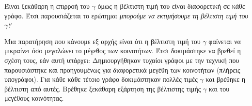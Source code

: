 \documentclass[12pt, letterpaper]{article}
\begin{document}
Έιναι ξεκάθαρη η επιρροή του $\gamma$ όμως η βέλτιστη τιμή του είναι διαφορετική 
σε κάθε γράφο. Έτσι παρουσιάζεται το ερώτημα: \emph{μπορούμε να εκτιμήσουμε τη 
βέλτιστη τιμή του $\gamma$?}





Μια παρατήρηση που κάνουμε εξ αρχής είναι ότι η βέλτιστη τιμή του $\gamma$ φαίνεται 
να μικραίνει όσο μεγαλώνει το μέγεθος των κοινοτήτων. Έτσι δοκιμάστηκε να βρεθεί 
η σχέση τους, εάν αυτή υπάρχει: 
Δημιουργήθηκαν τυχαίοι γράφοι με την τεχνική που παρουσιάστηκε και προηγουμένως 
για διαφορετικά μεγέθη των κοινοτήτων (πλήρεις υπογράφοι). Για κάθε κάθε τέτοιο 
γράφο δοκιμάστηκαν πολλές τιμές $\gamma$ και βρέθηκε η βέλτιστη από αυτές. 
Βρέθηκε ξεκάθαρη εξάρτηση της βέλτιστης τιμής $\gamma$ και του μεγέθους κοινότητας.
\end{document}
